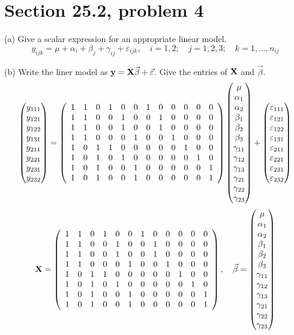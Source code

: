 \section{Section 25.2, problem 4}
(a) Give a scalar expression for an appropriate linear model.
$$y_{ijk}=\mu+\alpha_i+\beta_j+\gamma_{ij}+\varepsilon_{ijk},
\quad i=1,2;\quad j=1,2,3;\quad k=1,\ldots,n_{ij}$$

\bigskip
\noindent
(b) Write the liner model as ${\bf y}={\bf X}\vec\beta+\vec\varepsilon$.
Give the entries of $\bf X$ and $\vec\beta$.
$$\left(\begin{matrix}
y_{111}\cr
y_{121}\cr
y_{122}\cr
y_{131}\cr
y_{211}\cr
y_{221}\cr
y_{231}\cr
y_{232}
\end{matrix}\right)=\left(\begin{array}{cccccccccccc}
1 & 1 & 0 & 1 & 0 & 0 & 1 & 0 & 0 & 0 & 0 & 0\cr
1 & 1 & 0 & 0 & 1 & 0 & 0 & 1 & 0 & 0 & 0 & 0\cr
1 & 1 & 0 & 0 & 1 & 0 & 0 & 1 & 0 & 0 & 0 & 0\cr
1 & 1 & 0 & 0 & 0 & 1 & 0 & 0 & 1 & 0 & 0 & 0\cr
1 & 0 & 1 & 1 & 0 & 0 & 0 & 0 & 0 & 1 & 0 & 0\cr
1 & 0 & 1 & 0 & 1 & 0 & 0 & 0 & 0 & 0 & 1 & 0\cr
1 & 0 & 1 & 0 & 0 & 1 & 0 & 0 & 0 & 0 & 0 & 1\cr
1 & 0 & 1 & 0 & 0 & 1 & 0 & 0 & 0 & 0 & 0 & 1
\end{array}\right)\left(\begin{matrix}
\mu\cr
\alpha_1\cr
\alpha_2\cr
\beta_1\cr
\beta_2\cr
\beta_3\cr
\gamma_{11}\cr
\gamma_{12}\cr
\gamma_{13}\cr
\gamma_{21}\cr
\gamma_{22}\cr
\gamma_{23}
\end{matrix}\right)+\left(\begin{matrix}
\varepsilon_{111}\cr
\varepsilon_{121}\cr
\varepsilon_{122}\cr
\varepsilon_{131}\cr
\varepsilon_{211}\cr
\varepsilon_{221}\cr
\varepsilon_{231}\cr
\varepsilon_{232}
\end{matrix}\right)
$$
$$
{\bf X}=
\left(\begin{array}{cccccccccccc}
1 & 1 & 0 & 1 & 0 & 0 & 1 & 0 & 0 & 0 & 0 & 0\cr
1 & 1 & 0 & 0 & 1 & 0 & 0 & 1 & 0 & 0 & 0 & 0\cr
1 & 1 & 0 & 0 & 1 & 0 & 0 & 1 & 0 & 0 & 0 & 0\cr
1 & 1 & 0 & 0 & 0 & 1 & 0 & 0 & 1 & 0 & 0 & 0\cr
1 & 0 & 1 & 1 & 0 & 0 & 0 & 0 & 0 & 1 & 0 & 0\cr
1 & 0 & 1 & 0 & 1 & 0 & 0 & 0 & 0 & 0 & 1 & 0\cr
1 & 0 & 1 & 0 & 0 & 1 & 0 & 0 & 0 & 0 & 0 & 1\cr
1 & 0 & 1 & 0 & 0 & 1 & 0 & 0 & 0 & 0 & 0 & 1
\end{array}\right),\quad
\vec\beta=\left(\begin{matrix}
\mu\cr
\alpha_1\cr
\alpha_2\cr
\beta_1\cr
\beta_2\cr
\beta_3\cr
\gamma_{11}\cr
\gamma_{12}\cr
\gamma_{13}\cr
\gamma_{21}\cr
\gamma_{22}\cr
\gamma_{23}
\end{matrix}\right)
$$
